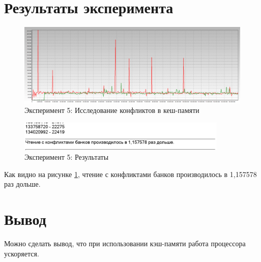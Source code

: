 \section{Результаты эксперимента}
\begin{figure}[ht!]
    \centering
    \includegraphics[width=170mm]{./img/task_05.png}
    \caption{Эксперимент 5: Исследование конфликтов в кеш-памяти}
\end{figure}

\begin{figure}[ht!]
    \centering
    \includegraphics[width=100mm]{./img/res_05.png}
    \caption{Эксперимент 5: Результаты\label{res_05}}
\end{figure}

Как видно на рисунке \ref{res_05}, чтение с конфликтами банков производилось в 1,157578 раз дольше.

\section{Вывод}
Можно сделать вывод, что при использовании кэш-памяти работа процессора ускоряется.